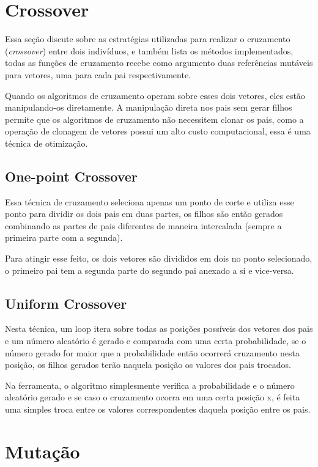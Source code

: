 \documentclass[12pt]{article}
\begin{document}
\section{Crossover}

Essa seção discute sobre as estratégias utilizadas para realizar o cruzamento (\textit{crossover}) entre dois indivíduos, e também lista
os métodos implementados, todas as funções de cruzamento recebe como argumento duas referências mutáveis para vetores, uma para 
cada pai respectivamente. 

Quando os algoritmos de cruzamento operam sobre esses dois vetores, eles estão manipulando-os 
diretamente. A manipulação direta nos pais sem gerar filhos permite que os algoritmos de 
cruzamento não necessitem clonar os pais, como a operação de clonagem de vetores 
possui um alto custo computacional, essa é uma técnica de otimização.

\subsection{One-point Crossover}

Essa técnica de cruzamento seleciona apenas um ponto de corte e utiliza esse ponto para dividir os dois 
pais em duas partes, os filhos são então gerados combinando as partes de pais diferentes de maneira 
intercalada (sempre a primeira parte com a segunda).

Para atingir esse feito, os dois vetores são divididos em dois no ponto selecionado, o primeiro pai tem a segunda parte do segundo 
pai anexado a si e vice-versa.

\subsection{Uniform Crossover}

Nesta técnica, um loop itera sobre todas as posições possíveis dos vetores dos pais e um número aleatório
é gerado e comparada com uma certa probabilidade, se o número gerado for maior que a probabilidade então 
ocorrerá cruzamento nesta posição, os filhos gerados terão naquela posição os valores dos pais trocados.

Na ferramenta, o algoritmo simplesmente verifica a probabilidade e o número aleatório gerado e se caso 
o cruzamento ocorra em uma certa posição x, é feita uma simples troca entre os valores correspondentes 
daquela posição entre os pais.

\section{Mutação}
\end{document}
